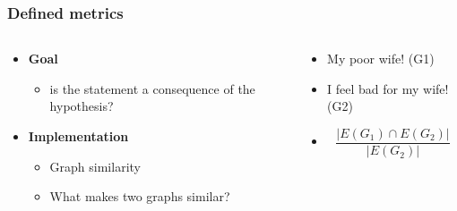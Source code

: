 \documentclass[bigger]{beamer}
\begin{document}
\begin{frame}
\frametitle{Defined metrics}
\begin{columns}
	\begin{column}{0.5\textwidth}
		\begin{itemize}
			\pause \item \textbf{Goal}
			\begin{itemize}
				\item is the statement a consequence of the hypothesis?
			\end{itemize}
			\pause \item \textbf{Implementation}
			\begin{itemize}
				\item Graph similarity
				\item What makes two graphs similar?
			\end{itemize}
		\end{itemize}
	\end{column}
	\begin{column}{0.5\textwidth}
		\begin{itemize}
			\pause \item My poor wife! (G1)
			\pause \item I feel bad for my wife! (G2)
			\pause \item \[\frac{|E(G_1)\cap E(G_2)|}{|E(G_2)|}\]			
		\end{itemize}
	\end{column}
\end{columns}

\end{frame}
\end{document}
